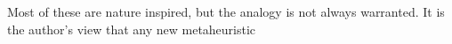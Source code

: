 






Most of these are nature inspired, but the analogy is not always warranted. It is the author's view that any new metaheuristic